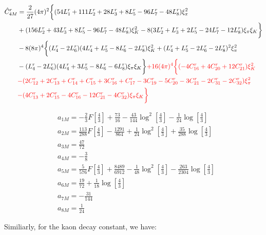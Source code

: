 \documentclass[12pt,a4paper]{article}
\begin{document}
\begin{align}
	\hat{C}^r_{4M} &= \frac{2}{27} (4 \pi)^2 \bigg\{ (54 L^r_{1}+111 L^r_{2}+28 L^r_{3}+8 L^r_{5}-96 L^r_{7}-48 L^r_{8}) \xi_{\pi}^2  \nonumber \\
	& + (156 L^r_{2}+43 L^r_{3}+8 L^r_{5}-96 L^r_{7}-48 L^r_{8}) \xi_K^2 - 8 (3 L^r_{2}+L^r_{3}+2 L^r_{5}-24 L^r_{7}-12 L^r_{8}) \xi_\pi \xi_K \bigg\} \nonumber \\
	& -8 (8 \pi )^4 \bigg\{ (L^r_{4}-2 L^r_{6}) (4 L^r_{4}+L^r_{5}-8 L^r_{6}-2 L^r_{8}) \xi_K^2 + (L^r_{4}+L^r_{5}-2 L^r_{6}-2 L^r_{8})^2  \xi_{\pi}^2 \nonumber \\
	& - (L^r_{4}-2 L^r_{6}) (4 L^r_{4}+3 L^r_{5}-8 L^r_{6}-6 L^r_{8}) \xi_{\pi} \xi_K \bigg\} \textcolor{red}{ + 16 (4 \pi )^4 \bigg\{ (-4 C^r_{16}+4 C^r_{20}+12 C^r_{21}) \xi_K^2 } \nonumber \\
	& \textcolor{red}{  - (2 C^r_{12}+2 C^r_{13}+C^r_{14}+C^r_{15}+3 C^r_{16}+C^r_{17}-3 C^r_{19}-5 C^r_{20}-3 C^r_{21}-2 C^r_{31}-2 C^r_{32}) \xi_\pi^2 } \nonumber \\
	& \textcolor{red}{  - (4 C^r_{13}+2 C^r_{15}-4 C^r_{16}-12 C^r_{21}-4 C^r_{32}) \xi_\pi \xi_K  \bigg\} }
\label{Eq:C4M}
\end{align} 


\begin{align}
	& a_{1M} = -\frac{2}{3} F\left[\frac{4}{3}\right]+\frac{73}{16}-\frac{43}{144} \log ^2\left[\frac{4}{3}\right]-\frac{1}{24} \log \left[\frac{4}{3}\right] \nonumber \\
	& a_{2M} = \frac{113}{288} F\left[\frac{4}{3}\right]-\frac{1291}{864}+\frac{1}{24} \log ^2\left[\frac{4}{3}\right]+\frac{35}{288} \log \left[\frac{4}{3}\right] \nonumber \\
	& a_{3M} = \frac{47}{72} \nonumber \\
	& a_{4M} = -\frac{3}{8} \nonumber \\
	& a_{5M} = \frac{5}{576} F\left[\frac{4}{3}\right]+\frac{8489}{6912}-\frac{1}{48} \log^2\left[\frac{4}{3}\right]-\frac{263}{2304}  \log \left[\frac{4}{3}\right] \nonumber \\
	& a_{6M} = \frac{19}{72}+\frac{1}{18} \log \left[\frac{4}{3}\right] \nonumber \\
	& a_{7M} = -\frac{31}{144} \nonumber \\
	& a_{8M} = \frac{1}{24}
\end{align}

Similiarly, for the kaon decay constant, we have:
\end{document}
